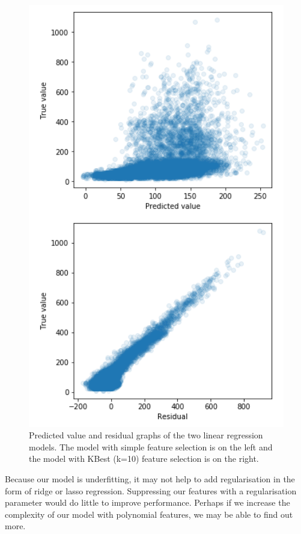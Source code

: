 \documentclass{article}
\begin{document}
\begin{figure}[H]
\begin{minipage}{0.45\textwidth}
\includegraphics[width=1\textwidth, keepaspectratio]{imgs/linreg-kbest.png}
\end{minipage}
\caption{Predicted value and residual graphs of the two linear regression models. The model with simple feature selection is on the left and the model with KBest (k=10) feature selection is on the right.}
\end{figure}
\noindent
Because our model is underfitting, it may not help to add regularisation in the form of ridge or lasso regression. Suppressing our features with a regularisation parameter would do little to improve performance. Perhaps if we increase the complexity of our model with polynomial features, we may be able to find out more. 
\end{document}
